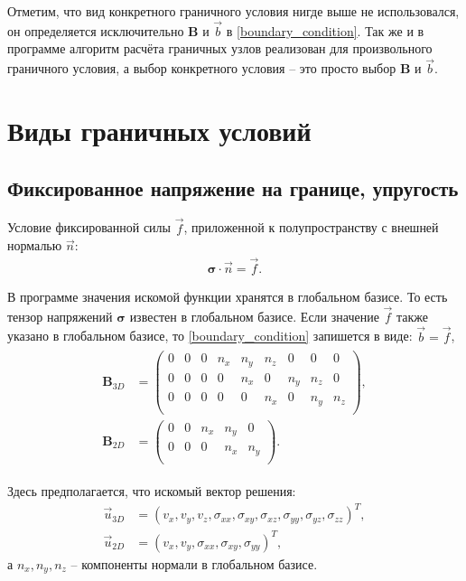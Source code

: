 Отметим, что вид конкретного граничного условия нигде выше не использовался, он определяется исключительно 
$\mathbf{B}$ и $\vec{b}$ в \eqref{boundary_condition}. Так же и в программе алгоритм расчёта граничных узлов реализован для произвольного граничного условия, а выбор конкретного условия -- это просто выбор $\mathbf{B}$ и $\vec{b}$.
 

\section{Виды граничных условий}

\subsection{Фиксированное напряжение на границе, упругость}

Условие фиксированной силы $\vec{f}$, приложенной к полупространству с внешней нормалью $\vec{n}$:
\begin{eqnarray}
\label{fixed_force}
	\mathbf{\sigma} \cdot \vec{n} = \vec{f}.
\end{eqnarray}

В программе значения искомой функции хранятся в глобальном базисе. То есть тензор напряжений $\mathbf{\sigma}$ известен в глобальном базисе. Если значение $\vec{f}$ также указано в глобальном базисе, то \eqref{boundary_condition} запишется в виде: $\vec{b} = \vec{f}$,
\begin{align}
\label{fixed_force_global_basis}
\begin{split}
	\mathbf{B}_{3D} &=
	\left( \begin{array}{cccccccccccc}
	 0 & 0 & 0 & n_x & n_y & n_z & 0 & 0 & 0 \\
	 0 & 0 & 0 & 0 & n_x & 0 & n_y & n_z & 0 \\
	 0 & 0 & 0 & 0 & 0 & n_x & 0 & n_y & n_z \\
	\end{array} \right), \\
	\mathbf{B}_{2D} &=
	\left( \begin{array}{cccccccccccc}
	 0 & 0 & n_x & n_y & 0 \\
	 0 & 0 & 0 & n_x & n_y \\
	\end{array} \right).
\end{split}
\end{align}

Здесь предполагается, что искомый вектор решения:
\begin{align}
	\vec{u}_{3D} &= (v_x,v_y,v_z,\sigma_{xx},\sigma_{xy},\sigma_{xz},\sigma_{yy},\sigma_{yz},\sigma_{zz})^{T}, \\
	\vec{u}_{2D} &= (v_x,v_y,\sigma_{xx},\sigma_{xy},\sigma_{yy})^{T},
\end{align}
а $n_x, n_y, n_z$ -- компоненты нормали в глобальном базисе.


